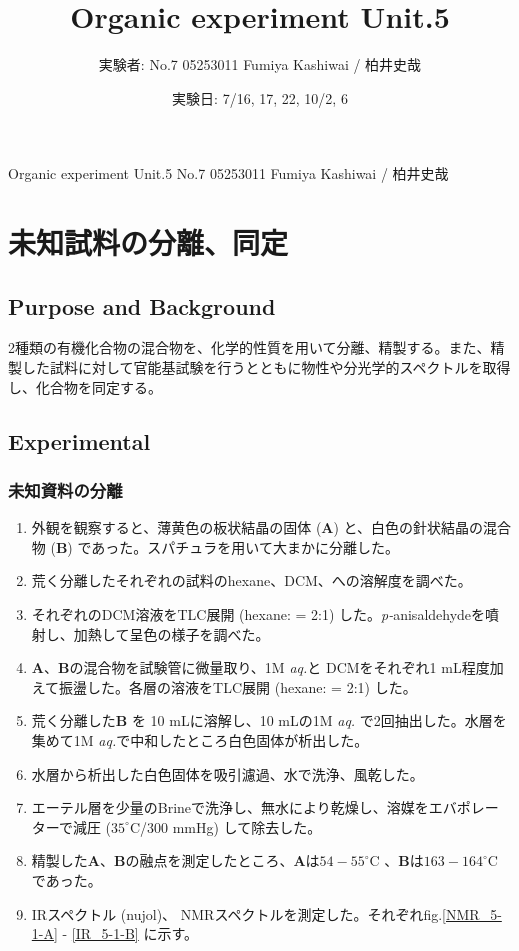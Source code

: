 \documentclass{ltjsarticle}
\theoremstyle{definition}
\numberwithin{equation}{section}
\newcommand{\D}{^\circ\text{C}}
\begin{document}
\title{Organic experiment Unit.5}
\date{実験日: 7/16, 17, 22, 10/2, 6}
\author{実験者: No.7 05253011 Fumiya Kashiwai / 柏井史哉}
\maketitle
{} {Organic experiment Unit.5 No.7 05253011 Fumiya Kashiwai / 柏井史哉}

\section{未知試料の分離、同定}
\subsection{Purpose and Background}
2種類の有機化合物の混合物を、化学的性質を用いて分離、精製する。また、精製した試料に対して官能基試験を行うとともに物性や分光学的スペクトルを取得し、化合物を同定する。

\subsection{Experimental}
\subsubsection{未知資料の分離}
\begin{enumerate}
\item 外観を観察すると、薄黄色の板状結晶の固体 (\textbf{A}) と、白色の針状結晶の混合物 (\textbf{B}) であった。スパチュラを用いて大まかに分離した。
\item 荒く分離したそれぞれの試料のhexane、DCM、への溶解度を調べた。
\item それぞれのDCM溶液をTLC展開 (hexane:  = 2:1) した。\textit{p-}anisaldehydeを噴射し、加熱して呈色の様子を調べた。
\item \textbf{A}、\textbf{B}の混合物を試験管に微量取り、1M \textit{aq.}と DCMをそれぞれ1 mL程度加えて振盪した。各層の溶液をTLC展開 (hexane:  = 2:1) した。
\item 荒く分離した\textbf{B} を 10 mLに溶解し、10 mLの1M \textit{aq.} で2回抽出した。水層を集めて1M \textit{aq.}で中和したところ白色固体が析出した。
\item 水層から析出した白色固体を吸引濾過、水で洗浄、風乾した。
\item エーテル層を少量のBrineで洗浄し、無水により乾燥し、溶媒をエバポレーターで減圧 ($35\D$/300 mmHg) して除去した。
\item 精製した\textbf{A}、\textbf{B}の融点を測定したところ、\textbf{A}は$54-55\D$ 、\textbf{B}は$163-164\D$
であった。
\item IRスペクトル (nujol)、 NMRスペクトルを測定した。それぞれfig.\ref{NMR_5-1-A} - \ref{IR_5-1-B} に示す。
\end{enumerate}
\end{document}
